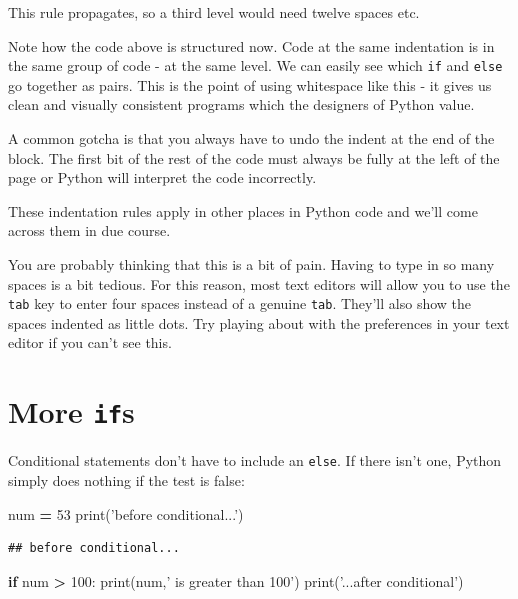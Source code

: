 \documentclass[]{book}
\newenvironment{Shaded}{\begin{snugshade}}{\end{snugshade}}
\newcommand{\BuiltInTok}[1]{#1}
\newcommand{\ControlFlowTok}[1]{\textcolor[rgb]{0.13,0.29,0.53}{\textbf{#1}}}
\newcommand{\DecValTok}[1]{\textcolor[rgb]{0.00,0.00,0.81}{#1}}
\newcommand{\NormalTok}[1]{#1}
\newcommand{\OperatorTok}[1]{\textcolor[rgb]{0.81,0.36,0.00}{\textbf{#1}}}
\newcommand{\StringTok}[1]{\textcolor[rgb]{0.31,0.60,0.02}{#1}}
\theoremstyle{definition}
\theoremstyle{definition}
\theoremstyle{definition}
\theoremstyle{remark}
\let\BeginKnitrBlock\begin \let\EndKnitrBlock\end
\begin{document}
This rule propagates, so a third level would need twelve spaces etc.

Note how the code above is structured now. Code at the same indentation
is in the same group of code - at the same level. We can easily see
which \texttt{if} and \texttt{else} go together as pairs. This is the
point of using whitespace like this - it gives us clean and visually
consistent programs which the designers of Python value.

A common gotcha is that you always have to undo the indent at the end of
the block. The first bit of the rest of the code must always be fully at
the left of the page or Python will interpret the code incorrectly.

These indentation rules apply in other places in Python code and we'll
come across them in due course.

\BeginKnitrBlock{reader}
You are probably thinking that this is a bit of pain. Having to type in
so many spaces is a bit tedious. For this reason, most text editors will
allow you to use the \texttt{tab} key to enter four spaces instead of a
genuine \texttt{tab}. They'll also show the spaces indented as little
dots. Try playing about with the preferences in your text editor if you
can't see this.
\EndKnitrBlock{reader}

\hypertarget{more-ifs}{%
\section{\texorpdfstring{More \texttt{if}s}{More ifs}}\label{more-ifs}}

Conditional statements don't have to include an \texttt{else}. If there
isn't one, Python simply does nothing if the test is false:

\begin{Shaded}
\begin{Highlighting}[]
\NormalTok{num }\OperatorTok{=} \DecValTok{53}
\BuiltInTok{print}\NormalTok{(}\StringTok{'before conditional...'}\NormalTok{)}
\end{Highlighting}
\end{Shaded}

\begin{verbatim}
## before conditional...
\end{verbatim}

\begin{Shaded}
\begin{Highlighting}[]
\ControlFlowTok{if}\NormalTok{ num }\OperatorTok{>} \DecValTok{100}\NormalTok{:}
    \BuiltInTok{print}\NormalTok{(num,}\StringTok{' is greater than 100'}\NormalTok{)}
\BuiltInTok{print}\NormalTok{(}\StringTok{'...after conditional'}\NormalTok{)}
\end{Highlighting}
\end{Shaded}
\end{document}
